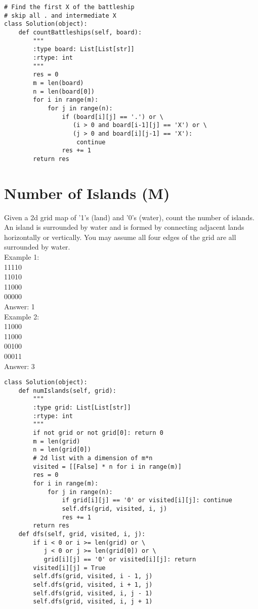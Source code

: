 \begin{lstlisting}
# Find the first X of the battleship
# skip all . and intermediate X
class Solution(object):
    def countBattleships(self, board):
        """
        :type board: List[List[str]]
        :rtype: int
        """
        res = 0
        m = len(board)
        n = len(board[0])
        for i in range(m):
            for j in range(n):
                if (board[i][j] == '.') or \
                   (i > 0 and board[i-1][j] == 'X') or \
                   (j > 0 and board[i][j-1] == 'X'):
                    continue
                res += 1
        return res
\end{lstlisting}


\section{Number of Islands (M)}
Given a 2d grid map of '1's (land) and '0's (water), count the number of islands. An island is surrounded by water and is formed by connecting adjacent lands horizontally or vertically. You may assume all four edges of the grid are all surrounded by water.\\

Example 1:\\
11110\\
11010\\
11000\\
00000\\
Answer: 1\\

Example 2:\\
11000\\
11000\\
00100\\
00011\\
Answer: 3\\

\begin{lstlisting}
class Solution(object):
    def numIslands(self, grid):
        """
        :type grid: List[List[str]]
        :rtype: int
        """
        if not grid or not grid[0]: return 0
        m = len(grid)
        n = len(grid[0])
        # 2d list with a dimension of m*n
        visited = [[False] * n for i in range(m)]
        res = 0
        for i in range(m):
            for j in range(n):
                if grid[i][j] == '0' or visited[i][j]: continue
                self.dfs(grid, visited, i, j)
                res += 1
        return res
    def dfs(self, grid, visited, i, j):
        if i < 0 or i >= len(grid) or \
           j < 0 or j >= len(grid[0]) or \
           grid[i][j] == '0' or visited[i][j]: return
        visited[i][j] = True
        self.dfs(grid, visited, i - 1, j)
        self.dfs(grid, visited, i + 1, j)
        self.dfs(grid, visited, i, j - 1)
        self.dfs(grid, visited, i, j + 1)
\end{lstlisting}

